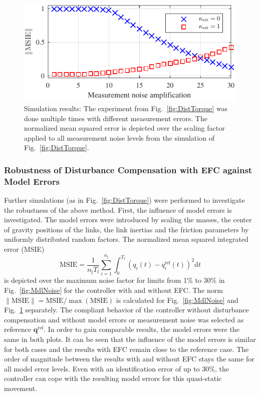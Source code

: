 %
\begin{figure}
\centering
\parbox{\columnwidth}{
\includegraphics[width=\linewidth]{simulations/SimExp_MesNoiseExtForce.pdf}
}
\caption{Simulation results: The experiment from Fig.~\ref{fig:DistTorque} was done multiple times with different measurement errors.
The normalized mean squared error is depicted over the scaling factor applied to all measurement noise levels from the simulation of Fig.~\ref{fig:DistTorque}.}
\label{fig:MesNoise}
\SkipBeforeText
\end{figure}
%
\subsubsection{Robustness of Disturbance Compensation with EFC against Model Errors}
Further simulations (as in Fig.~\ref{fig:DistTorque}) were performed to investigate the robustness of the above method.
First, the influence of model errors is investigated.
The model errors were introduced by scaling the masses, the center of gravity positions of the links, the link inertias and the friction parameters by uniformly distributed random factors.
The normalized mean squared integrated error (MSIE)
\begin{equation}
\mathrm{MSIE}=\frac{1}{n_{\mathrm{j}}T_\mathrm{f}}\sum_{i=1}^{n_{\mathrm{j}}}\int_0^{T_\mathrm{f}} \left(q_i(t)-q_i^{\mathrm{ref}}(t)\right)^2\mathrm{d}t
\end{equation}
is depicted over the maximum noise factor for limits from 1\% to 30\% in Fig.~\ref{fig:MdlNoise} for the controller with and without EFC.
The norm $\|\mathrm{MSIE}\|=\mathrm{MSIE}/\max(\mathrm{MSIE})$ is calculated for Fig.~\ref{fig:MdlNoise} and Fig.~\ref{fig:MesNoise} separately.
The compliant behavior of the controller without disturbance compensation and without model errors or measurement noise was selected as reference $\bm{q}^\mathrm{ref}$.
In order to gain comparable results, the model errors were the same in both plots.
It can be seen that the influence of the model errors is similar for both cases and the results with EFC remain close to the reference case. The order of magnitude between the results with and without EFC stays the same for all model error levels.
Even with an identification error of up to $30\%$, the controller can cope with the resulting model errors for this quasi-static movement.

